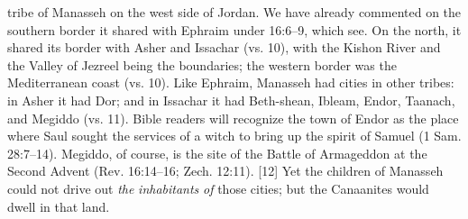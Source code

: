 {tribe of Manasseh on the west side of Jordan.
We have already commented on the southern
border it shared with Ephraim under 16:6–9,
which see. On the north, it shared its border
with Asher and Issachar (vs. 10), with the
Kishon River and the Valley of Jezreel being
the boundaries; the western border was the
Mediterranean coast (vs. 10). Like Ephraim,
Manasseh had cities in other tribes: in Asher it
had Dor; and in Issachar it had Beth-shean,
Ibleam, Endor, Taanach, and Megiddo (vs. 11).
Bible readers will recognize the town of
Endor as the place where Saul sought the
services of a witch to bring up the spirit of
Samuel (1 Sam. 28:7–14). Megiddo, of course,
is the site of the Battle of Armageddon at the
Second Advent (Rev. 16:14–16; Zech. 12:11).}
[12] \textcolor[rgb]{0.00,0.00,1.00}{Yet the children of Manasseh could not drive out \emph{the} \emph{inhabitants} \emph{of} those cities; but the Canaanites would dwell in that land.}
